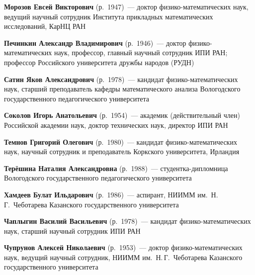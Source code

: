 \begin{multicols}{2}
\noindent
\textbf{Морозов Евсей Викторович}  (р.\ 1947)~---  доктор физико-математических наук, ведущий 
научный сотрудник Института прикладных математических исследований, КарНЦ РАН

\vspace*{6pt}

\noindent
\textbf{Печинкин Александр Владимирович} (р.\ 1946)~--- доктор физико-математических наук,
профессор, главный научный сотрудник ИПИ РАН; профессор Российского университета
дружбы народов (РУДН)

\vspace*{6pt}

\noindent
\textbf{Сатин Яков Александрович} (р.\ 1978)~--- кандидат
физико-математических наук, старший преподаватель кафедры
математического анализа Вологодского государственного
педагогического университета


\vspace*{6pt}

\noindent %
\textbf{Соколов Игорь Анатольевич} (р.\ 1954)~---
академик (действительный член) Российской академии наук,
доктор технических наук, директор ИПИ РАН


\vspace*{6pt}

\noindent
\textbf{Темнов  Григорий Олегович} (р.\ 1980)~--- кандидат физико-математических наук, научный
сотрудник и преподаватель Коркского  университета, Ирландия

\vspace*{6pt}


\noindent
\textbf{Терёшина Наталия Александровна} (р.\ 1988)~--- студентка-дипломница Вологодского государственного
педагогического университета

\vspace*{6pt}


\noindent
\textbf{Хамдеев Булат Ильдарович} (р.\ 1986)~--- 
аспирант, НИИММ им.\ Н.\,Г.~Чеботарева Казанского государственного
университета

\vspace*{6pt}

\noindent
\textbf{Чаплыгин Василий Васильевич} (р.\ 1978)~---  кандидат 
физико-математических наук, старший научный сотрудник ИПИ РАН

\vspace*{6pt}

\noindent
\textbf{Чупрунов Алексей Николаевич} (р.\ 1953)~--- доктор физико-математических наук,
ведущий научный сотрудник, НИИММ им.\ Н.\,Г.~Чеботарева Казанского государственного
университета


\end{multicols}

